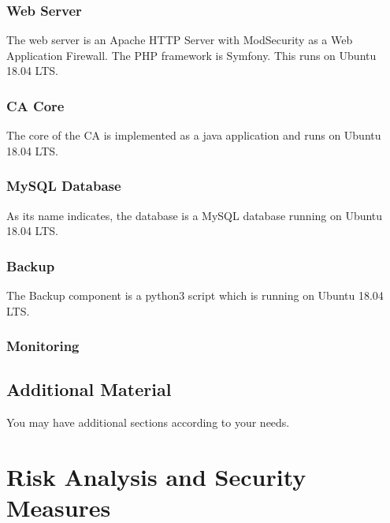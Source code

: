 \documentclass[english]{article}
\begin{document}
\subsubsection{Web Server}
The web server is an Apache HTTP Server with ModSecurity as a Web Application Firewall. The PHP framework is Symfony. This runs on Ubuntu 18.04 LTS.
\subsubsection{CA Core}
The core of the CA is implemented as a java application and runs on Ubuntu 18.04 LTS.
\subsubsection{MySQL Database}
As its name indicates, the database is a MySQL database running on Ubuntu 18.04 LTS.
\subsubsection{Backup}
The Backup component is a python3 script which is running on Ubuntu 18.04 LTS.
\subsubsection{Monitoring}

\subsection{Additional Material}

You may have additional sections according to your needs.


\section{Risk Analysis and Security Measures}
\end{document}
